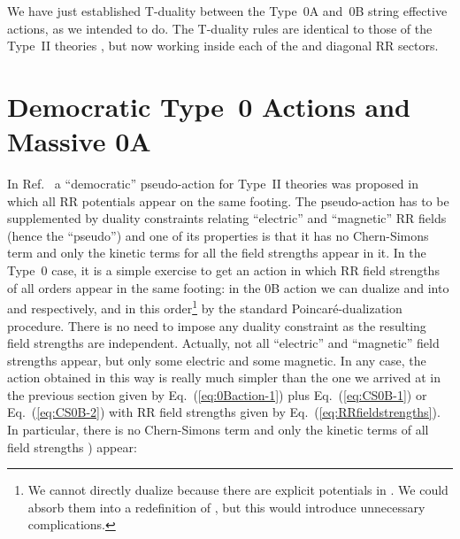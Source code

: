 \documentclass[12pt,a4paper]{article}
\begin{document}
We have just established T-duality between the Type~0A and~0B string
effective actions, as we intended to do. The T-duality rules are
identical to those of the Type~II theories \cite{kn:MO}, but now
working inside each of the \myHighlight{${}^{+}$}\coordHE{} and \myHighlight{${}^{-}$}\coordHE{} diagonal RR sectors.












\section{Democratic Type~0 Actions and Massive 0A}
\label{sec:DemAction}
%
In Ref.~\cite{kn:BKORvP} a ``democratic'' pseudo-action for Type~II
theories was proposed in which all RR potentials appear on the same
footing. The pseudo-action has to be supplemented by duality
constraints relating ``electric'' and ``magnetic'' RR fields (hence
the ``pseudo'') and one of its properties is that it has no
Chern-Simons term and only the kinetic terms for all the field
strengths appear in it. In the Type~0 case, it is a simple exercise to
get an action in which RR field strengths of all orders appear in the
same footing: in the 0B action we can dualize \coordHE{} and
\coordHE{} into \coordHE{} and \coordHE{}
respectively, and in this order\footnote{We cannot directly dualize
  \coordHE{} because there are explicit \coordHE{}
  potentials in \coordHE{}. We could absorb them into a
  redefinition of \coordHE{}, but this would introduce
  unnecessary complications.} by the standard Poincar\'e-dualization
procedure. There is no need to impose any duality constraint as the
resulting \coordHE{} field
strengths are independent. Actually, not all ``electric'' and
``magnetic'' field strengths appear, but only some electric and some
magnetic. In any case, the action obtained in this way is really much
simpler than the one we arrived at in the previous section
given by Eq.~(\ref{eq:0Baction-1}) plus
Eq.~(\ref{eq:CS0B-1}) or Eq.~(\ref{eq:CS0B-2}) with RR field strengths
given by Eq.~(\ref{eq:RRfieldstrengths}). In particular, there is no
Chern-Simons term and only the kinetic terms of all field strengths
\coordHE{}  \coordHE{}) appear:
\end{document}
